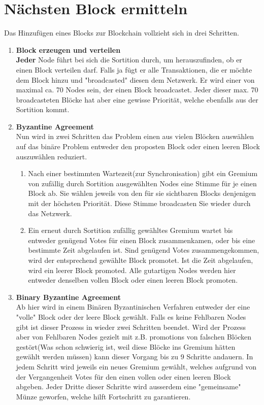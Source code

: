 \documentclass[11pt,a4paper]{article}
\begin{document}
\section*{N\"achsten Block ermitteln}
Das Hinzuf\"ugen eines Blocks zur Blockchain vollzieht sich in drei Schritten.
\begin{enumerate}[label=\arabic*)]
	\item \textbf{Block erzeugen und verteilen}\\
	\textbf{Jeder} Node f\"uhrt bei sich die Sortition durch, um herauszufinden, ob er einen Block verteilen darf. Falls ja f\"ugt er alle Transaktionen, die er m\"ochte dem Block hinzu und "broadcasted" diesen dem Netzwerk. Er wird einer von maximal ca. 70 Nodes sein, der einen Block broadcastet. Jeder dieser max. 70 broadcasteten Bl\"ocke hat aber eine gewisse Priorit\"at, welche ebenfalls aus der Sortition kommt.
	 
	\item \textbf{Byzantine Agreement}\\
	Nun wird in zwei Schritten das Problem \grqq{}einen aus vielen Bl\"ocken ausw\"ahlen\grqq{} auf das bin\"are Problem \grqq{}entweder den proposten Block oder einen leeren Block auszuw\"ahlen\grqq{} reduziert.
	\begin{enumerate}[label=\Roman*)]
		\item Nach einer bestimmten Wartezeit(zur Synchronisation) gibt ein Gremium von zuf\"allig durch Sortition ausgew\"ahlten Nodes eine Stimme f\"ur je einen Block ab. Sie w\"ahlen jeweils von den f\"ur sie sichtbaren Blocks denjenigen mit der h\"ochsten Priorit\"at. Diese Stimme broadcasten Sie wieder durch das Netzwerk.
		
		\item Ein erneut durch Sortition zuf\"allig gew\"ahltes Gremium wartet bis entweder gen\"ugend Votes f\"ur einen Block zusammenkamen, oder bis eine bestimmte Zeit abgelaufen ist. 
		Sind gen\"ugend Votes zusammengekommen, wird der entsprechend gew\"ahlte Block promotet.
		Ist die Zeit abgelaufen, wird ein leerer Block promoted. 
		Alle gutartigen Nodes werden hier entweder denselben vollen Block oder einen leeren Block promoten. 
	\end{enumerate}
	\item \textbf{Binary Byzantine Agreement}\\
	Ab hier wird in einem Bin\"aren Byzantinischen Verfahren entweder der eine "volle" Block oder der leere Block gew\"ahlt. Falls es keine Fehlbaren Nodes gibt ist dieser Prozess in wieder zwei Schritten beendet. Wird der Prozess aber von Fehlbaren Nodes gezielt mit z.B. promotions von falschen Bl\"ocken gest\"ort(Was schon schwierig ist, weil diese Bl\"ocke ins Gremium h\"atten gew\"ahlt werden m\"ussen) kann dieser Vorgang bis zu 9 Schritte andauern.
	In jedem Schritt wird jeweils ein neues Gremium gew\"ahlt, welches aufgrund von der Vergangenheit Votes f\"ur den einen vollen oder einen leeren Block abgeben. Jeder Dritte dieser Schritte wird ausserdem eine "gemeinsame" M\"unze geworfen, welche hilft Fortschritt zu garantieren. 
\end{enumerate}
\end{document}
